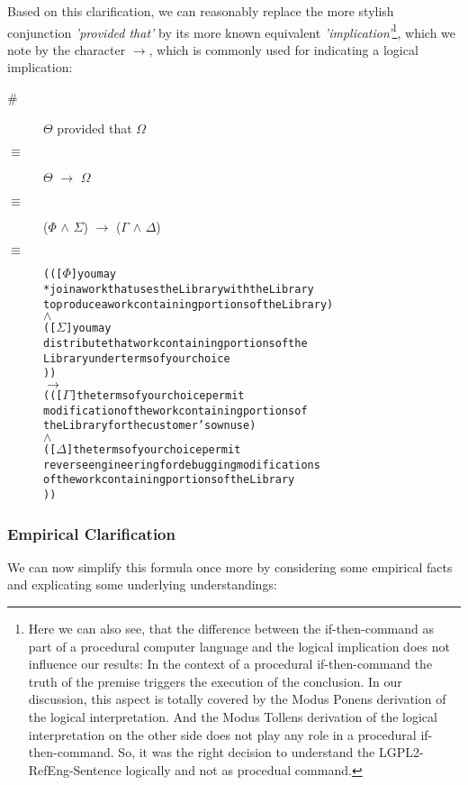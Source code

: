 Based on this clarification, we can reasonably replace the more stylish
conjunction \emph{'provided that'} by its more known equivalent
\emph{'implication'}\footnote{Here we can also see, that the difference between
the if-then-command as part of a procedural computer language and the logical
implication does not influence our results: In the context of a procedural
if-then-command the truth of the premise triggers the execution of the
conclusion. In our discussion, this aspect is totally covered by the Modus
Ponens derivation of the logical interpretation. And the Modus Tollens
derivation of the logical interpretation on the other side does not play any
role in a procedural if-then-command. So, it was the right decision to
understand the LGPL2-RefEng-Sentence logically and not as procedual command.},
which we note by the character \emph{$\rightarrow$}, which is commonly used
for indicating a logical implication:

\begin{description}
  \item[\#]  $\Theta$ provided that $\Omega$
  \item[$\equiv$] $\Theta$ $\rightarrow$ $\Omega$
  \item[$\equiv$] ($\Phi$ $\wedge$ $\Sigma$) $\rightarrow$ ($\Gamma$ $\wedge$
  $\Delta$)
  \item[$\equiv$]
\begin{alltt}   
  ( ( [\(\Phi\)] you may 
       *join a work that uses the Library with the Library
       to produce a work containing portions of the Library )
  \(\wedge\)
  ( [\(\Sigma\)] you may 
        distribute that work containing portions of the 
        Library under terms of your choice 
) )
\(\rightarrow\)
( ( [\(\Gamma\)] the terms of your choice permit 
        modification of the work containing portions of 
        the Library for the customer's own use )
  \(\wedge\)
  ( [\(\Delta\)] the terms of your choice permit
        reverse engineering for debugging modifications 
        of the work containing portions of the Library   
) )
\end{alltt}
\end{description}

\subsubsection{Empirical Clarification}

We can now simplify this formula once more by considering some empirical facts
and explicating some underlying understandings:

